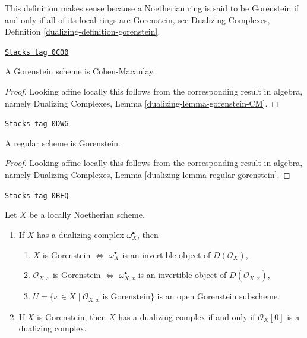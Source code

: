 This definition makes sense because a Noetherian ring is said to
be Gorenstein if and only if all of its local rings are Gorenstein,
see Dualizing Complexes, Definition \ref{dualizing-definition-gorenstein}.

\begin{lemma}[Gorenstein CM]
\label{duality-lemma-gorenstein-CM}
\href{https://stacks.math.columbia.edu/tag/0C00}{\texttt{Stacks tag 0C00}}

A Gorenstein scheme is Cohen-Macaulay.
\end{lemma}

\begin{proof}
Looking affine locally this follows from the corresponding
result in algebra, namely
Dualizing Complexes, Lemma \ref{dualizing-lemma-gorenstein-CM}.
\end{proof}

\begin{lemma}
\label{duality-lemma-regular-gorenstein}
\href{https://stacks.math.columbia.edu/tag/0DWG}{\texttt{Stacks tag 0DWG}}

A regular scheme is Gorenstein.
\end{lemma}

\begin{proof}
Looking affine locally this follows from the corresponding
result in algebra, namely
Dualizing Complexes, Lemma \ref{dualizing-lemma-regular-gorenstein}.
\end{proof}

\begin{lemma}[Gorenstein]
\label{duality-lemma-gorenstein}
\href{https://stacks.math.columbia.edu/tag/0BFQ}{\texttt{Stacks tag 0BFQ}}

Let $X$ be a locally Noetherian scheme.
\begin{enumerate}
\item If $X$ has a dualizing complex $\omega_X^\bullet$, then
\begin{enumerate}
\item $X$ is Gorenstein $\Leftrightarrow$ $\omega_X^\bullet$ is an invertible
object of $D(\mathcal{O}_X)$,
\item $\mathcal{O}_{X, x}$ is Gorenstein $\Leftrightarrow$
$\omega_{X, x}^\bullet$ is an invertible object of $D(\mathcal{O}_{X, x})$,
\item $U = \{x \in X \mid \mathcal{O}_{X, x}\text{ is Gorenstein}\}$
is an open Gorenstein subscheme.
\end{enumerate}
\item If $X$ is Gorenstein, then $X$ has a dualizing complex if and
only if $\mathcal{O}_X[0]$ is a dualizing complex.
\end{enumerate}
\end{lemma}

